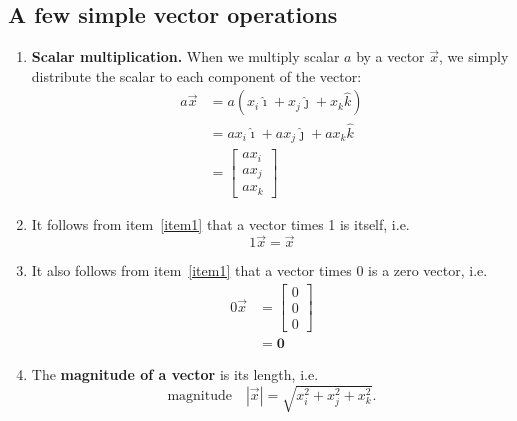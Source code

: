 \documentclass{tufte-handout}
\begin{document}
\subsection{A few simple vector operations}
\begin{enumerate}
\item\label{item1} \textbf{Scalar multiplication.} When we multiply scalar $a$ by a vector $\vec{x}$, we simply distribute the scalar to each component of the vector:
\begin{align}
a \vec{x} &= a (x_i \hat{\imath} + x_j \hat{\jmath} + x_k \hat{k})  \\
&= ax_i \hat{\imath} + ax_j \hat{\jmath} + ax_k \hat{k} \\
&= \begin{bmatrix} ax_i \\ ax_j \\ ax_k \end{bmatrix}
\end{align}
\item It follows from item~\ref{item1} that a vector times 1 is itself, i.e.
\begin{equation}
1 \vec{x} = \vec{x}
\end{equation}
\item It also follows from item~\ref{item1} that a vector times 0 is a zero vector, i.e.
\begin{align}
0 \vec{x} &= \begin{bmatrix} 0 \\ 0 \\ 0 \end{bmatrix} \\
&= \mathbf{0} 
\end{align}
\item The \textbf{magnitude of a vector} is its length, i.e.
\begin{equation}
\text{magnitude}\quad | \vec{x} | = \sqrt{x_i^2 + x_j^2 + x_k^2}.
\end{equation}


\end{enumerate}
\end{document}
